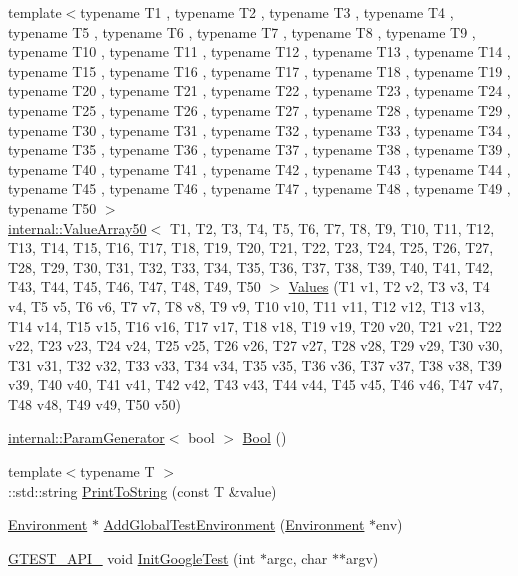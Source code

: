 \begin{DoxyCompactItemize}
{\footnotesize template$<$typename T1 , typename T2 , typename T3 , typename T4 , typename T5 , typename T6 , typename T7 , typename T8 , typename T9 , typename T10 , typename T11 , typename T12 , typename T13 , typename T14 , typename T15 , typename T16 , typename T17 , typename T18 , typename T19 , typename T20 , typename T21 , typename T22 , typename T23 , typename T24 , typename T25 , typename T26 , typename T27 , typename T28 , typename T29 , typename T30 , typename T31 , typename T32 , typename T33 , typename T34 , typename T35 , typename T36 , typename T37 , typename T38 , typename T39 , typename T40 , typename T41 , typename T42 , typename T43 , typename T44 , typename T45 , typename T46 , typename T47 , typename T48 , typename T49 , typename T50 $>$ }\\\mbox{\hyperlink{classtesting_1_1internal_1_1ValueArray50}{internal\+::\+Value\+Array50}}$<$ T1, T2, T3, T4, T5, T6, T7, T8, T9, T10, T11, T12, T13, T14, T15, T16, T17, T18, T19, T20, T21, T22, T23, T24, T25, T26, T27, T28, T29, T30, T31, T32, T33, T34, T35, T36, T37, T38, T39, T40, T41, T42, T43, T44, T45, T46, T47, T48, T49, T50 $>$ \mbox{\hyperlink{namespacetesting_a7b6008393a1fa7b55b07fbad67c1c811}{Values}} (T1 v1, T2 v2, T3 v3, T4 v4, T5 v5, T6 v6, T7 v7, T8 v8, T9 v9, T10 v10, T11 v11, T12 v12, T13 v13, T14 v14, T15 v15, T16 v16, T17 v17, T18 v18, T19 v19, T20 v20, T21 v21, T22 v22, T23 v23, T24 v24, T25 v25, T26 v26, T27 v27, T28 v28, T29 v29, T30 v30, T31 v31, T32 v32, T33 v33, T34 v34, T35 v35, T36 v36, T37 v37, T38 v38, T39 v39, T40 v40, T41 v41, T42 v42, T43 v43, T44 v44, T45 v45, T46 v46, T47 v47, T48 v48, T49 v49, T50 v50)
\item 
\mbox{\hyperlink{classtesting_1_1internal_1_1ParamGenerator}{internal\+::\+Param\+Generator}}$<$ bool $>$ \mbox{\hyperlink{namespacetesting_aa9f9150ed43f949c8a6bacf3f04c03ce}{Bool}} ()
\item 
{\footnotesize template$<$typename T $>$ }\\\+::std\+::string \mbox{\hyperlink{namespacetesting_aa5717bb1144edd1d262d310ba70c82ed}{Print\+To\+String}} (const T \&value)
\item 
\mbox{\hyperlink{classtesting_1_1Environment}{Environment}} $\ast$ \mbox{\hyperlink{namespacetesting_a460d7b998622e332392c1e00be3a60d5}{Add\+Global\+Test\+Environment}} (\mbox{\hyperlink{classtesting_1_1Environment}{Environment}} $\ast$env)
\item 
\mbox{\hyperlink{gtest-port_8h_aa73be6f0ba4a7456180a94904ce17790}{G\+T\+E\+S\+T\+\_\+\+A\+P\+I\+\_\+}} void \mbox{\hyperlink{namespacetesting_afd726ae08c9bd16dc52f78c822d9946b}{Init\+Google\+Test}} (int $\ast$argc, char $\ast$$\ast$argv)
$$
\end{DoxyCompactItemize}
